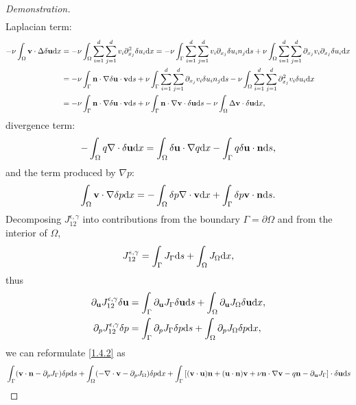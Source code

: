 \documentclass[oneside,11pt]{book}
\numberwithin{equation}{section}
\begin{document}
\begin{proof}[Demonstration]
\begin{align}
    \end{align}
    Laplacian term:
    \begin{align}
        -\nu\int_\Omega {\bf v}\cdot\Delta\delta{\bf u}{\rm d}x &= -\nu\int_\Omega \sum_{i=1}^d\sum_{j=1}^d v_i\partial_{x_j}^2\delta u_i{\rm d}x = -\nu\int_\Gamma \sum_{i=1}^d\sum_{j=1}^d v_i\partial_{x_j}\delta u_in_j{\rm d}s + \nu\int_\Omega \sum_{i=1}^d\sum_{j=1}^d \partial_{x_j}v_i\partial_{x_j}\delta u_i{\rm d}x\\
        &= -\nu\int_\Gamma {\bf n}\cdot\nabla\delta{\bf u}\cdot{\bf v}{\rm d}s + \nu\int_\Gamma \sum_{i=1}^d\sum_{j=1}^d \partial_{x_j}v_i\delta u_in_j{\rm d}s - \nu \int_\Omega \sum_{i=1}^d\sum_{j=1}^d \partial_{x_j}^2v_i\delta u_i{\rm d}x\\
        &= -\nu\int_\Gamma {\bf n}\cdot\nabla\delta{\bf u}\cdot{\bf v}{\rm d}s + \nu\int_\Gamma {\bf n}\cdot\nabla{\bf v}\cdot\delta{\bf u}{\rm d}s - \nu\int_\Omega \Delta{\bf v}\cdot\delta{\bf u}{\rm d}x,
    \end{align}
    divergence term:
    \begin{align}
        -\int_\Omega q\nabla\cdot\delta{\bf u}{\rm d}x = \int_\Omega \delta{\bf u}\cdot\nabla q{\rm d}x - \int_\Gamma q\delta{\bf u}\cdot{\bf n}{\rm d}s,
    \end{align}
    and the term produced by $\nabla p$:
    \begin{align}
        \int_\Omega {\bf v}\cdot\nabla\delta p{\rm d}x = -\int_\Omega \delta p\nabla\cdot{\bf v}{\rm d}x + \int_\Gamma \delta p{\bf v}\cdot{\bf n}{\rm d}s.
    \end{align}
    Decomposing $J_{12}^{\epsilon,\gamma}$ into contributions from the boundary $\Gamma = \partial\Omega$ and from the interior of $\Omega$,
    \begin{align}
        J_{12}^{\epsilon,\gamma} = \int_\Gamma J_\Gamma{\rm d}s + \int_\Omega J_\Omega{\rm d}x,
    \end{align}
    thus
    \begin{align}
        \partial_{\bf u}J_{12}^{\epsilon,\gamma}\delta{\bf u} &= \int_\Gamma \partial_{\bf u}J_\Gamma\delta{\bf u}{\rm d}s + \int_\Omega \partial_{\bf u}J_\Omega\delta{\bf u}{\rm d}x,\\
        \partial_pJ_{12}^{\epsilon,\gamma}\delta p &= \int_\Gamma \partial_pJ_\Gamma\delta p{\rm d}s + \int_\Omega \partial_pJ_\Omega\delta p{\rm d}x,
    \end{align}
    we can reformulate \eqref{1.4.2} as
    \begin{align}
        &\int_\Gamma ({\bf v}\cdot{\bf n} - \partial_pJ_\Gamma)\delta p{\rm d}s + \int_\Omega (-\nabla\cdot{\bf v} - \partial_pJ_\Omega)\delta p{\rm d}x + \int_\Gamma \left[({\bf v}\cdot{\bf u}){\bf n} + ({\bf u}\cdot{\bf n}){\bf v} + \nu{\bf n}\cdot\nabla{\bf v} - q{\bf n} - \partial_{\bf u}J_\Gamma\right]\cdot\delta{\bf u}{\rm d}s \nonumber\\

\end{align}
\end{proof}
\end{document}
